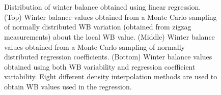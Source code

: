 \documentclass{sfuthesis}
\begin{document}
\begin{appendices}
\begin{figure}[b!]
	\centering
	\\%
	\\%
	\caption[]{Distribution of winter balance obtained using linear regression. (Top) Winter balance values obtained from a Monte Carlo sampling of normally distributed WB variation (obtained from zigzag measurements) about the local WB value. (Middle) Winter balance  values obtained from a Monte Carlo sampling of normally distributed regression coefficients. (Bottom) Winter balance  values obtained using both WB variability and regression coefficient variability. Eight different density interpolation methods are used to obtain WB values used in the regression.}
	\label{fig:WSMB_LR_allDensity}
\end{figure}



\end{appendices}
\end{document}
